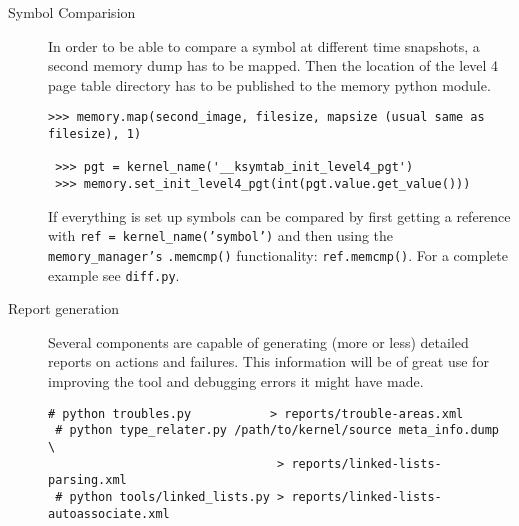 \begin{description}
    \item[Symbol Comparision]
	In order to be able to compare a symbol at different time snapshots, a second memory dump has to be mapped. 
	Then the location of the level 4 page table directory has to be published to the memory python module.
	\begin{lstlisting}[frame=single,caption=Mapping a second memory image,label=lst:map]
 >>> memory.map(second_image, filesize, mapsize (usual same as filesize), 1)

 >>> pgt = kernel_name('__ksymtab_init_level4_pgt')
 >>> memory.set_init_level4_pgt(int(pgt.value.get_value()))
	\end{lstlisting}
	If everything is set up symbols can be compared by first getting a reference with \texttt{ref = kernel\_name('symbol')} and 		then using the \texttt{memory\_manager's} \texttt{.memcmp()} functionality: \texttt{ref.memcmp()}.
	For a complete example see \texttt{diff.py}.
    \item[Report generation]
	Several components are capable of generating (more or less) detailed reports on actions and failures.
	This information will be of great use for improving the tool and debugging errors it might have made.
        \begin{lstlisting}[frame=single,caption=Generating Reports,label=lst:workflow]
 # python troubles.py           > reports/trouble-areas.xml
 # python type_relater.py /path/to/kernel/source meta_info.dump \
                                > reports/linked-lists-parsing.xml
 # python tools/linked_lists.py > reports/linked-lists-autoassociate.xml
        \end{lstlisting}
\end{description}
